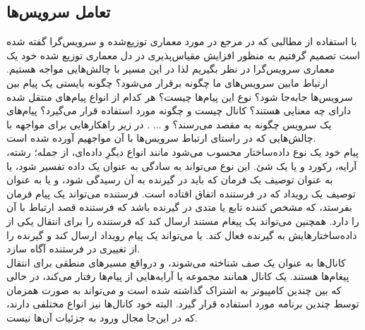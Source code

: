 \subsection{تعامل سرویس‌ها}
با استفاده از مطالبی که در  مرجع  در مورد معماری‌ توزیع‌شده و سرویس‌گرا گفته شده است تصمیم گرفتیم به منظور افزایش مقیاس‌پذیری در دل معماری توزیع شده خود یک معماری سرویس‌گرا در نظر بگیریم لذا در این مسیر با چالش‌هایی مواجه هستیم. ارتباط مابین سرویس‌های ما چگونه برقرار می‌شود؟ چگونه بایستی یک پیام بین سرویس‌ها جا‌به‌جا شود؟ نوع این پیام‌ها چیست؟ هر کدام از انواع پیام‌های منتقل شده دارای چه معنایی هستند؟ کانال چیست و چگونه مورد استفاده قرار می‌گیرد؟ پیام‌های یک سرویس چگونه به مقصد می‌رسند؟ و ... . در زیر راهکارهایی برای مواجهه با چالش‌هایی که در راستای ارتباط سرویس‌ها با آن مواجهیم آورده شده است.\\
پیام خود یک نوع داده‌ساختار محسوب می‌شود مانند انواع دیگرِ داده‌ای، از جمله؛ رشته، آرایه، رکورد و یا یک شئ. این نوع می‌تواند به سادگی به عنوان یک داده‌ تفسیر شود، یا به عنوان توصیف یک فرمان که باید در گیرنده به آن رسیدگی شود، و یا به عنوان توصیف یک رویداد که در فرستنده اتفاق افتاده است. فرستنده می‌تواند یک پیام فرمان بفرستد، که مشخص کننده تابع یا متدی در گیرنده باشد که فرستنده قصد ارتباط با آن را دارد. همچنین می‌تواند یک پیغام مستند ارسال کند که فرستنده را برای انتقال یکی از داده‌ساختارهایش به گیرنده فعال کند. یا می‌‌تواند یک پیام رویداد ارسال کند و گیرنده را از تغییری در فرستنده آگاه سازد.\\
کانال‌ها به عنوان یک صف شناخته می‌شوند، و درواقع مسیرهای منطقی برای انتقال پیغام‌ها هستند. یک کانال همانند مجموعه‌ یا آرایه‌هایی از پیام‌ها رفتار می‌کند، در حالی که بین چندین کامپیوتر  به اشتراک گذاشته شده است و می‌تواند به صورت همزمان توسط چندین برنامه مورد استفاده قرار گیرد. البته خود کانال‌ها نیز انواع مختلفی دارند، که در این‌جا مجال ورود به جزئیات آن‌ها نیست. 
